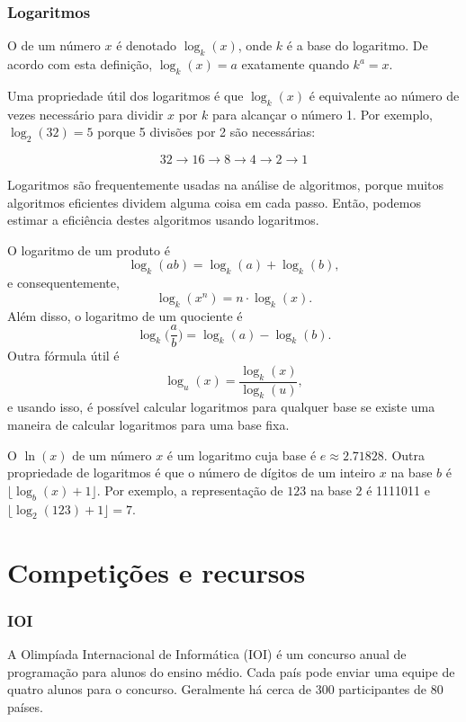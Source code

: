 \subsubsection{Logaritmos}


O  de um número $x$
é denotado $\log_k(x)$, onde $k$ é a base
do logaritmo.
De acordo com esta definição,
$\log_k(x)=a$ exatamente quando $k^a=x$.

Uma propriedade útil dos logaritmos é
que $\log_k(x)$ é equivalente ao número de vezes
necessário para dividir $x$ por $k$ para
alcançar o número 1.
Por exemplo, $\log_2(32)=5$
porque 5 divisões por 2 são necessárias:

\[32 \rightarrow 16 \rightarrow 8 \rightarrow 4 \rightarrow 2 \rightarrow 1 \]

Logaritmos são frequentemente usadas na análise de algoritmos, porque muitos
algoritmos eficientes dividem alguma coisa em cada passo.
Então, podemos estimar a eficiência destes algoritmos usando logaritmos.

O logaritmo de um produto é
\[\log_k(ab) = \log_k(a)+\log_k(b),\]
e consequentemente,
\[\log_k(x^n) = n \cdot \log_k(x).\]
Além disso, o logaritmo de um quociente é
\[\log_k\Big(\frac{a}{b}\Big) = \log_k(a)-\log_k(b).\]
Outra fórmula útil é
\[\log_u(x) = \frac{\log_k(x)}{\log_k(u)},\]
e usando isso, é possível calcular logaritmos para qualquer base se existe
uma maneira de calcular logaritmos para uma base fixa.


O  $\ln(x)$ de um número $x$
é um logaritmo cuja base é $e \approx 2.71828$.
Outra propriedade de logaritmos é que
o número de dígitos de um inteiro $x$ na base $b$ é
$\lfloor \log_b(x)+1 \rfloor$.
Por exemplo, a representação de
$123$ na base $2$ é 1111011 e
$\lfloor \log_2(123)+1 \rfloor = 7$.

\section{Competições e recursos}

\subsubsection{IOI}

A Olimpíada Internacional de Informática (IOI)
é um concurso anual de programação para
alunos do ensino médio.
Cada país pode enviar uma equipe de
quatro alunos para o concurso.
Geralmente há cerca de 300 participantes
de 80 países.

